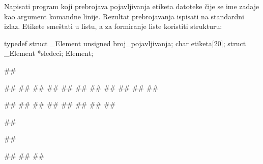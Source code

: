\begin{Exercise}[label=4_03]
Napisati program koji prebrojava pojavljivanja etiketa 
datoteke čije se ime zadaje kao argument komandne linije. Rezultat prebrojavanja 
ispisati na standardni izlaz. Etikete smeštati u listu, a za formiranje liste koristiti strukturu:
\begin{ckod} 
 typedef struct _Element
 {
   unsigned broj_pojavljivanja;
   char etiketa[20];
   struct _Element *sledeci;
 } Element;
\end{ckod}
\begin{miditest}
\begin{test}{1}
##

##
##                       
##
##
##
##
##
##     
## 
## 
## 

#\naslovIzlaz#
##
##
##
##
##
##
##
\end{test}
\end{miditest}
\begin{miditest}
\begin{test}{2}
##

##

#\naslovIzlazZaGresku#
##
##
\end{test}
\end{miditest}
% 
% 
\end{Exercise}
\begin{Answer}[ref=4_03]
\end{Answer}

